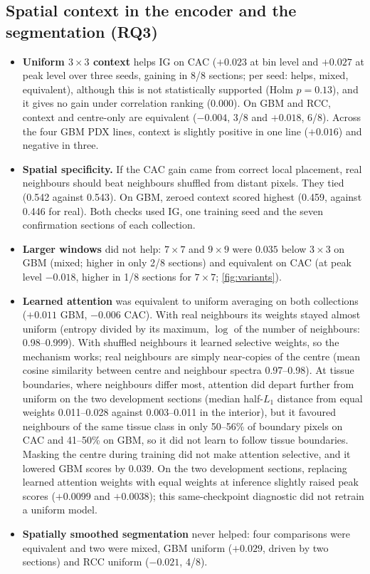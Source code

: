 \subsection{Spatial context in the encoder and the segmentation (RQ3)}
\label{sec:res-spatial}
\begin{itemize}
  \item \textbf{Uniform $3\times3$ context} helps IG on CAC ($+0.023$ at bin
        level and $+0.027$ at peak level over three seeds, gaining in 8/8
        sections; per seed: helps, mixed, equivalent), although this is not statistically supported (Holm
        $p=0.13$), and it gives no gain under correlation ranking (0.000). On
        GBM and RCC, context and centre-only are equivalent ($-0.004$, 3/8
        and $+0.018$, 6/8). Across the four GBM PDX lines, context is
        slightly positive in one line ($+0.016$) and negative in three.
  \item \textbf{Spatial specificity.} If the CAC gain came from correct local
        placement, real neighbours should beat neighbours shuffled from
        distant pixels. They tied (0.542 against 0.543). On GBM, zeroed
        context scored highest (0.459, against 0.446 for real). Both
        checks used IG, one training seed and the seven confirmation sections
        of each collection.
  \item \textbf{Larger windows} did not help: $7\times7$ and $9\times9$ were
        $0.035$ below $3\times3$ on GBM (mixed; higher in only 2/8 sections)
        and equivalent on CAC (at peak level $-0.018$, higher in 1/8 sections
        for $7\times7$; \cref{fig:variants}).
  \item \textbf{Learned attention} was equivalent to uniform averaging on both
        collections ($+0.011$ GBM, $-0.006$ CAC). With real neighbours its
        weights stayed almost uniform (entropy divided by its maximum,
        $\log$ of the number of neighbours: 0.98--0.999). With
        shuffled neighbours it learned selective weights, so the mechanism
        works; real neighbours are simply near-copies of the centre (mean
        cosine similarity between centre and neighbour spectra 0.97--0.98). At tissue boundaries, where neighbours differ most,
        attention did depart further from uniform on the two development
        sections (median half-$L_1$ distance from equal weights 0.011--0.028
        against 0.003--0.011 in the interior),
        but it favoured neighbours of the same tissue class in only 50--56\%
        of boundary pixels on CAC and 41--50\% on GBM, so it did not learn to
        follow tissue boundaries. Masking the centre during
        training did not make attention selective, and it lowered GBM scores
        by $0.039$. On the two development sections, replacing
        learned attention weights with equal weights at inference slightly
        raised peak scores ($+0.0099$ and $+0.0038$); this same-checkpoint
        diagnostic did not retrain a uniform model.
  \item \textbf{Spatially smoothed segmentation} never helped: four
        comparisons were equivalent and two were mixed, GBM uniform ($+0.029$,
        driven by two sections) and RCC uniform ($-0.021$, 4/8).
\end{itemize}

